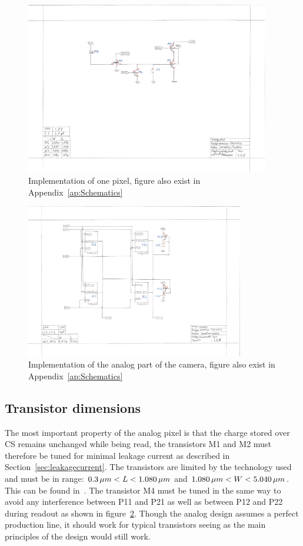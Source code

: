 \begin{figure}[htbp]
  \centering
  \includegraphics[width=0.95\textwidth]{figures/SchematicPixel}
  \caption{Implementation of one pixel, figure also exist in Appendix~\ref{ap:Schematics}}\label{fig:implpixel}
\end{figure}
\begin{figure}[htbp]
  \centering
  \includegraphics[width=0.85\textwidth]{figures/SchematicCamera}
  \caption{Implementation of the analog part of the camera, figure also exist in Appendix~\ref{ap:Schematics}}\label{fig:implcamera}
\end{figure}



\subsection{Transistor dimensions}

The most important property of the analog pixel is that the charge stored over CS remains unchanged while being read,
the transistors M1 and M2 must therefore be tuned for minimal leakage current as described in Section~\ref{sec:leakagecurrent}.
The transistors are limited by the technology used and must be in range: $0.3 \mskip3mu \mu m < L < 1.080 \mskip3mu \mu m$ and $1.080 \mskip3mu \mu m < W < 5.040 \mskip3mu \mu m $. This can be found in~\cite{oppgave}.
The transistor M4 must be tuned in the same way to avoid any interference between P11 and P21 as well as between P12 and P22 during readout as shown in figure~\ref{fig:implcamera}.
Though the analog design assumes a perfect production line, it should work for typical transistors seeing as the main principles of the design would still work.

